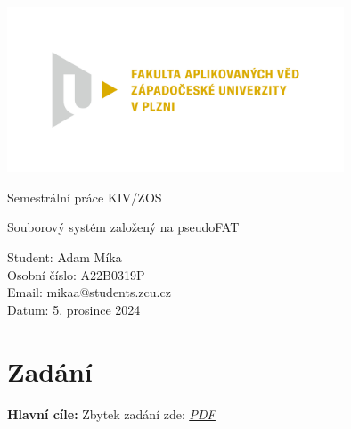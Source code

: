 \documentclass[12pt, a4paper]{article}
\begin{document}
\begin{titlepage}
    \includegraphics[width=0.75\textwidth]{img/fav.png}
    \begin{center}
        
        
        \vspace{2cm}
        
        \Huge
        Semestrální práce KIV/ZOS
        
        \vspace{1cm}
        
        \LARGE
        Souborový systém založený na pseudoFAT       
        \vfill
        
        \vspace{0.5cm}
        
        \normalsize
        \raggedright
        Student:        Adam Míka \\
        Osobní číslo:   A22B0319P \\
        Email:          mikaa@students.zcu.cz \\
        Datum:          5. prosince 2024
        \vspace{0.2cm}
        
    \end{center}
\end{titlepage}

\renewcommand{\cftsecleader}{\cftdotfill{\cftdotsep}}
\renewcommand{\cftsubsecleader}{\cftdotfill{\cftdotsep}}
\renewcommand{\cftsubsubsecleader}{\cftdotfill{\cftdotsep}}

\setcounter{page}{2}
\tableofcontents
\listoffigures
\lstlistoflistings
\pagebreak


\section{Zadání}
\large
\textbf{Hlavní cíle:}
\normalsize
Zbytek zadání zde: \href{https://portal.zcu.cz/CoursewarePortlets2/DownloadDokumentu?id=238432}{\textcolor[RGB]{20,20,200}{\underline{\textit{PDF}}}}
\end{document}
